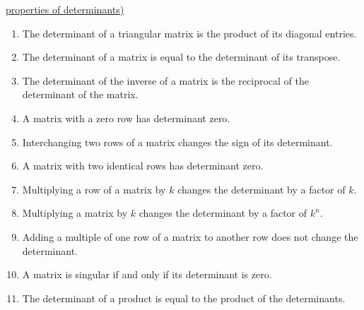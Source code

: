 \documentclass{ximera}
\begin{document}
\href{https://ximera.osu.edu/linearalgebradzv3/LinearAlgebraInteractiveIntro/DET-0040/main}{properties of determinants)}
\begin{expandable}{}{}
\begin{enumerate}
    \item The determinant of a triangular matrix is the product of its diagonal entries.

    \item The determinant of a matrix is equal to the determinant of its transpose.

    \item The determinant of the inverse of a matrix is the reciprocal of the determinant of the matrix.

    \item A matrix with a zero row has determinant zero.

    \item Interchanging two rows of a matrix changes the sign of its determinant.

    \item A matrix with two identical rows has determinant zero.

    \item Multiplying a row of a matrix by $k$ changes the determinant by a factor of $k$.

    \item Multiplying a matrix by $k$ changes the determinant by a factor of $k^n$.

    \item Adding a multiple of one row of a matrix to another row does not change the determinant. 

    \item A matrix is singular if and only if its determinant is zero.

    \item The determinant of a product is equal to the product of the determinants.
\end{enumerate}
\end{expandable}

\end{document}
